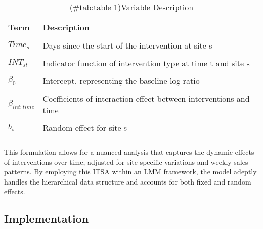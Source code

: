 \documentclass[
]{article}
\begin{document}
\begin{table}

\caption{(\#tab:table 1)Variable Description}
\centering
\begin{tabular}[t]{ll}
\toprule
Term & Description\\
\midrule
\cellcolor{gray!6}{$LogRatio_{st}$} & \cellcolor{gray!6}{Log ratio of zero-calorie to sugary beverage sales}\\
$Time_s$ & Days since the start of the intervention at site s\\
\cellcolor{gray!6}{$Site_t$} & \cellcolor{gray!6}{Indicator function of site at time t}\\
$INT_{st}$ & Indicator function of intervention type at time t and site s\\
\cellcolor{gray!6}{$DOW_{st}$} & \cellcolor{gray!6}{Indicator function of day of week at time t and site s}\\
\addlinespace
$\beta_0$ & Intercept, representing the baseline log ratio\\
\cellcolor{gray!6}{$\beta_{int}$} & \cellcolor{gray!6}{Coefficients of fixed effect of the intervention}\\
$\beta_{int:time}$ & Coefficients of interaction effect between interventions and time\\
\cellcolor{gray!6}{$\beta_{dow}$} & \cellcolor{gray!6}{Coefficient of fixed effect of the day of the week}\\
$b_{s}$ & Random effect for site s\\
\addlinespace
\cellcolor{gray!6}{$\epsilon_{st}$} & \cellcolor{gray!6}{Error term for the model at time t and site s}\\
\bottomrule
\end{tabular}
\end{table}

This formulation allows for a nuanced analysis that captures the dynamic effects of interventions over time, adjusted for site-specific variations and weekly sales patterns. By employing this ITSA within an LMM framework, the model adeptly handles the hierarchical data structure and accounts for both fixed and random effects.

\hypertarget{implementation}{%
\subsection{Implementation}\label{implementation}}
\end{document}
